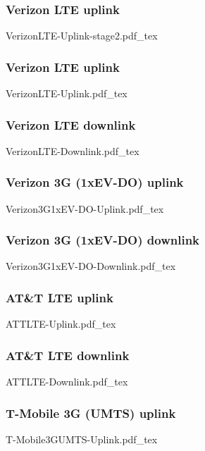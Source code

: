 \documentclass[svgnames]{beamer}
\begin{document}
\begin{frame}
\frametitle{Verizon LTE uplink}
\vspace{-1 cm}
\def\svgwidth{\columnwidth}\footnotesize{VerizonLTE-Uplink-stage2.pdf_tex}
\end{frame}

\begin{frame}
\frametitle{Verizon LTE uplink}
\vspace{-1 cm}
\def\svgwidth{\columnwidth}\footnotesize{VerizonLTE-Uplink.pdf_tex}
\end{frame}

\begin{frame}
\frametitle{Verizon LTE downlink}
\vspace{-1 cm}
\def\svgwidth{\columnwidth}\footnotesize{VerizonLTE-Downlink.pdf_tex}
\end{frame}

\begin{frame}
\frametitle{Verizon 3G (1xEV-DO) uplink}
\vspace{-1 cm}
\def\svgwidth{\columnwidth}\footnotesize{Verizon3G1xEV-DO-Uplink.pdf_tex}
\end{frame}


\begin{frame}
\frametitle{Verizon 3G (1xEV-DO) downlink}
\vspace{-1 cm}
\def\svgwidth{\columnwidth}\footnotesize{Verizon3G1xEV-DO-Downlink.pdf_tex}
\end{frame}

\begin{frame}
\frametitle{AT\&T LTE  uplink}
\vspace{-1 cm}
\def\svgwidth{\columnwidth}\footnotesize{ATTLTE-Uplink.pdf_tex}
\end{frame}


\begin{frame}
\frametitle{AT\&T LTE downlink}
\vspace{-1 cm}
\def\svgwidth{\columnwidth}\footnotesize{ATTLTE-Downlink.pdf_tex}
\end{frame}

\begin{frame}
\frametitle{T-Mobile 3G (UMTS)  uplink}
\vspace{-1 cm}
\def\svgwidth{\columnwidth}\footnotesize{T-Mobile3GUMTS-Uplink.pdf_tex}
\end{frame}
\end{document}
